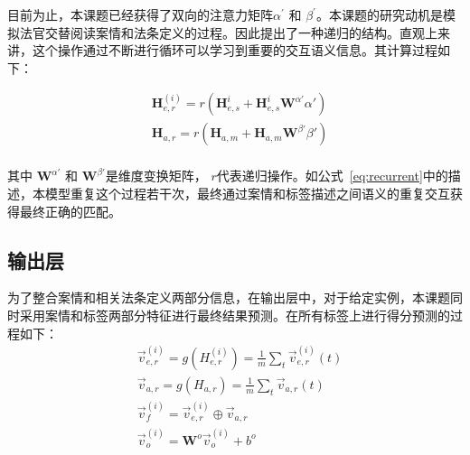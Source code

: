 目前为止，本课题已经获得了双向的注意力矩阵$\alpha^{'}$ 和 $\beta^{'}$。本课题的研究动机是模拟法官交替阅读案情和法条定义的过程。因此提出了一种递归的结构。直观上来讲，这个操作通过不断进行循环可以学习到重要的交互语义信息。其计算过程如下：

\begin{equation}\label{eq:recurrent}
    \begin{aligned}
        & \textbf{H}_{e,r}^{(i)} = r(\textbf{H}_{e,s}^{i} + \textbf{H}_{e,s}^{i}\textbf{W}^{\alpha{'}}\alpha{'}) \\
        & \textbf{H}_{a,r} = r(\textbf{H}_{a,m} + \textbf{H}_{a,m}\textbf{W}^{\beta{'}}\beta{'}) \\
    \end{aligned}
\end{equation}

其中 $\textbf{W}^{\alpha{'}}$ 和 $\textbf{W}^{\beta{'}}$是维度变换矩阵， $r$代表递归操作。如公式~\ref{eq:recurrent}中的描述，本模型重复这个过程若干次，最终通过案情和标签描述之间语义的重复交互获得最终正确的匹配。


\subsection{输出层}
为了整合案情和相关法条定义两部分信息，在输出层中，对于给定实例，本课题同时采用案情和标签两部分特征进行最终结果预测。在所有标签上进行得分预测的过程如下：
\begin{equation}
    \begin{aligned}
        & \vec{v}_{e,r}^{(i)} = g(H_{e,r}^{(i)}) = \frac{1}{m}\sum\limits_{t}\vec{v}_{e,r}^{(i)}(t) \\
        & \vec{v}_{a,r} = g(H_{a,r}) = \frac{1}{m}\sum\limits_{t}\vec{v}_{a,r}(t) \\
        & \vec{v}_{f}^{(i)} = \vec{v}_{e,r}^{(i)} \oplus \vec{v}_{a,r} \\
        & \vec{v}_{o}^{(i)} = \textbf{W}^{o}\vec{v}_{o}^{(i)} + b^{o}
    \end{aligned}
\end{equation}

